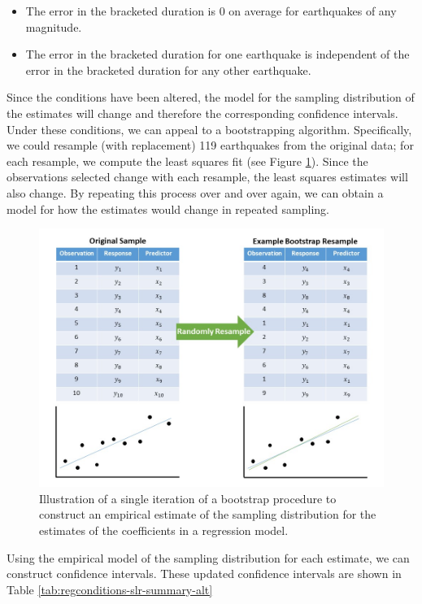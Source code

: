 \documentclass[]{book}
\providecommand{\tightlist}{%
  \setlength{\itemsep}{0pt}\setlength{\parskip}{0pt}}
\theoremstyle{plain}
\theoremstyle{mydefn}
\theoremstyle{myexmpl}
\theoremstyle{remark}
\begin{document}
\begin{itemize}
\tightlist
\item
  The error in the bracketed duration is 0 on average for earthquakes of
  any magnitude.
\item
  The error in the bracketed duration for one earthquake is independent
  of the error in the bracketed duration for any other earthquake.
\end{itemize}

Since the conditions have been altered, the model for the sampling
distribution of the estimates will change and therefore the
corresponding confidence intervals. Under these conditions, we can
appeal to a bootstrapping algorithm. Specifically, we could resample
(with replacement) 119 earthquakes from the original data; for each
resample, we compute the least squares fit (see Figure
\ref{fig:regconditions-bootstrap}). Since the observations selected
change with each resample, the least squares estimates will also change.
By repeating this process over and over again, we can obtain a model for
how the estimates would change in repeated sampling.

\begin{figure}

{\centering \includegraphics[width=0.8\linewidth]{./images/RegConditions-Bootstrap} 

}

\caption{Illustration of a single iteration of a bootstrap procedure to construct an empirical estimate of the sampling distribution for the estimates of the coefficients in a regression model.}\label{fig:regconditions-bootstrap}
\end{figure}

Using the empirical model of the sampling distribution for each
estimate, we can construct confidence intervals. These updated
confidence intervals are shown in Table
\ref{tab:regconditions-slr-summary-alt}
\end{document}
